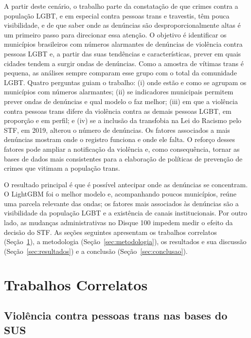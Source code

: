 \documentclass[12pt]{article}
\begin{document}
A partir deste cenário, o trabalho parte da constatação de que crimes contra a população LGBT, e em especial contra pessoas trans e travestis, têm pouca visibilidade, e de que saber onde as denúncias são desproporcionalmente altas é um primeiro passo para direcionar essa atenção. O objetivo é identificar os municípios brasileiros com números alarmantes de denúncias de violência contra pessoas LGBT e, a partir das suas tendências e características, prever em quais cidades tendem a surgir ondas de denúncias. Como a amostra de vítimas trans é pequena, as análises sempre comparam esse grupo com o total da comunidade LGBT. Quatro perguntas guiam o trabalho: (i) onde estão e como se agrupam os municípios com números alarmantes; (ii) se indicadores municipais permitem prever ondas de denúncias e qual modelo o faz melhor; (iii) em que a violência contra pessoas trans difere da violência contra as demais pessoas LGBT, em proporção e em perfil; e (iv) se a inclusão da transfobia na Lei do Racismo pelo STF, em 2019, alterou o número de denúncias. Os fatores associados a mais denúncias mostram onde o registro funciona e onde ele falta. O reforço desses fatores pode ampliar a notificação da violência e, como consequência, tornar as bases de dados mais consistentes para a elaboração de políticas de prevenção de crimes que vitimam a população trans.

O resultado principal é que é possível antecipar onde as denúncias se concentram. O LightGBM foi o melhor modelo e, acompanhando poucos municípios, reúne uma parcela relevante das ondas; os fatores mais associados às denúncias são a visibilidade da população LGBT e a existência de canais institucionais. Por outro lado, as mudanças administrativas no Disque 100 impedem medir o efeito da decisão do STF. As seções seguintes apresentam os trabalhos correlatos (Seção~\ref{sec:correlatos}), a metodologia (Seção~\ref{sec:metodologia}), os resultados e sua discussão (Seção~\ref{sec:resultados}) e a conclusão (Seção~\ref{sec:conclusao}).


\section{Trabalhos Correlatos}
\label{sec:correlatos}

\subsection{Violência contra pessoas trans nas bases do SUS}
\end{document}
